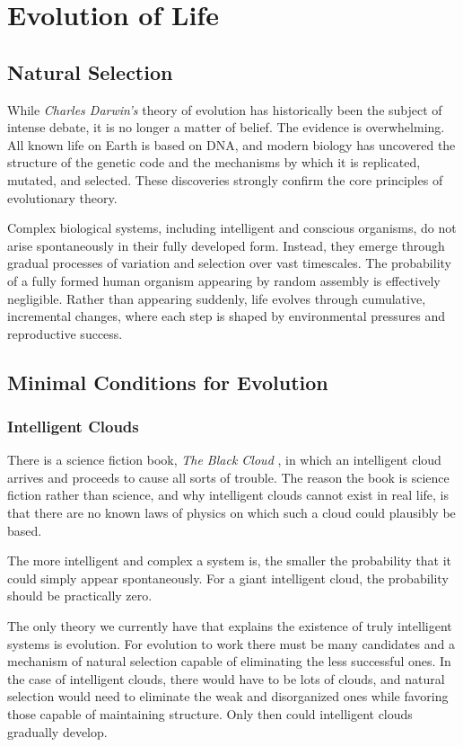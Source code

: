 \chapter{Evolution of Life}

\section{Natural Selection}

While \textit{Charles Darwin's} theory of evolution has historically been the subject of intense debate, it is no longer a matter of belief. The evidence is overwhelming.
All known life on Earth is based on DNA, and modern biology has uncovered the structure of the genetic code and the mechanisms by which it is replicated, mutated, and selected.
These discoveries strongly confirm the core principles of evolutionary theory.

Complex biological systems, including intelligent and conscious organisms, do not arise spontaneously in their fully developed form.
Instead, they emerge through gradual processes of variation and selection over vast timescales.
The probability of a fully formed human organism appearing by random assembly is effectively negligible.
Rather than appearing suddenly, life evolves through cumulative, incremental changes, where each step is shaped by environmental pressures and reproductive success.


\section{Minimal Conditions for Evolution}

\subsection*{Intelligent Clouds}

There is a science fiction book, \emph{The Black Cloud} \cite{hoyle1957blackcloud},
in which an intelligent cloud arrives and proceeds to cause all sorts
of trouble. The reason the book is science fiction rather than science,
and why intelligent clouds cannot exist in real life, is that there are
no known laws of physics on which such a cloud could plausibly be based.

The more intelligent and complex a system is, the smaller the
probability that it could simply appear spontaneously. For a giant
intelligent cloud, the probability should be practically zero.

The only theory we currently have that explains the existence of
truly intelligent systems is evolution. For evolution to work there
must be many candidates and a mechanism of natural selection capable
of eliminating the less successful ones. In the case of intelligent
clouds, there would have to be lots of clouds, and natural selection
would need to eliminate the weak and disorganized ones while favoring
those capable of maintaining structure. Only then could intelligent
clouds gradually develop.


